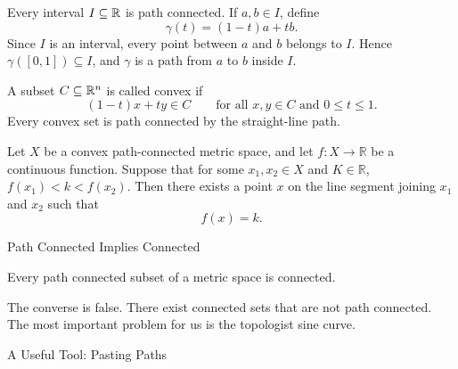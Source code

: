 \documentclass[12pt, a4paper]{article}
\begin{document}
\clearpage

\begin{problem}
Every interval $I\subseteq\mathbb{R}$ is path connected. If $a,b\in I$, define
\[
    \gamma(t)=(1-t)a+tb.
\]
Since $I$ is an interval, every point between $a$ and $b$ belongs to $I$. Hence $\gamma([0,1])\subseteq I$, and $\gamma$ is a path from $a$ to $b$ inside $I$.
\end{problem}

\clearpage

\begin{definition}
A subset $C\subseteq\mathbb{R}^n$ is called convex if
\[
    (1-t)x+ty\in C
    \qquad\text{for all }x,y\in C\text{ and }0\leq t\leq 1.
\]
Every convex set is path connected by the straight-line path.
\end{definition}

\clearpage

\begin{theorem}
Let \(X\) be a convex path-connected metric space, and let
\(
f:X\to \mathbb{R}
\)
be a continuous function. Suppose that for some \(x_1,x_2\in X\) and
\(K\in\mathbb{R}\),
\(
f(x_1)<k<f(x_2).
\)
Then there exists a point \(x\) on the line segment joining \(x_1\) and
\(x_2\) such that
\[
f(x)=k.
\]
\end{theorem}

\clearpage

\begin{heading}
    Path Connected Implies Connected
\end{heading}

\vspace{10pt}

\begin{theorem}
Every path connected subset of a metric space is connected.
\end{theorem}



\begin{problem}[Converse?]
The converse is false. There exist connected sets that are not path connected. The most important problem for us is the topologist sine curve.
\end{problem}

\clearpage

\begin{heading}
    A Useful Tool: Pasting Paths
\end{heading}
\end{document}
